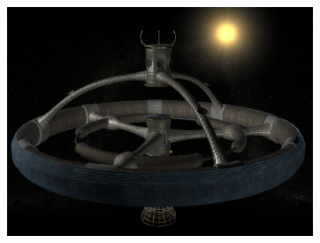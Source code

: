 \documentclass[11pt,a4paper]{article}
\begin{document}
\begin{figure}[H]
\begin{subfigure}{0.32\textwidth}
 \centering
  \includegraphics[width=\textwidth]{images/station02}
 \end{subfigure}
 

\end{figure}
\end{document}
